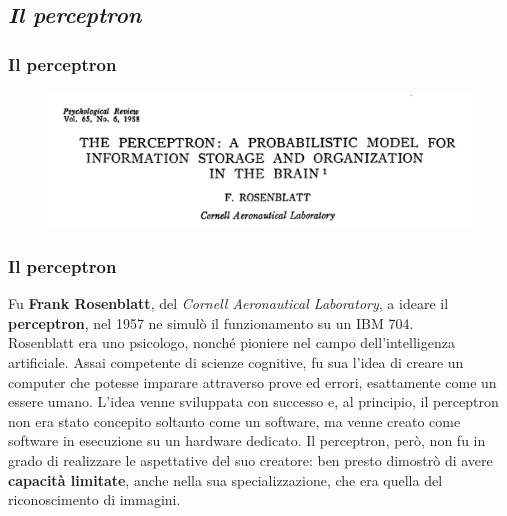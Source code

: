 \subsection[Il perceptron]{\textit{Il perceptron}}

\begin{frame}
	
	\frametitle{Il perceptron}

		\begin{figure}[!htbp]
			\centering
			\includegraphics[width=1.0\linewidth]{images/supervised/perceptron/ronsenblatt_psychological_review.jpg}
		\end{figure}

\end{frame}


\begin{frame}
	
	\frametitle{Il perceptron}
	
		Fu \textbf{Frank Rosenblatt}, del \textit{Cornell Aeronautical Laboratory}, a ideare il \textbf{perceptron}, nel 1957 ne simulò il funzionamento su un IBM 704.\\
		Rosenblatt era uno psicologo, nonché pioniere nel campo dell'intelligenza artificiale. Assai competente di scienze cognitive, fu sua l'idea di creare un computer che potesse imparare attraverso prove ed errori, esattamente come un essere umano.
		\newlinedouble
		L'idea venne sviluppata con successo e, al principio, il perceptron non era stato concepito soltanto come un software, ma venne creato come software in esecuzione su un hardware dedicato.
		\newlinedouble
		Il perceptron, però, non fu in grado di realizzare le aspettative del suo creatore: ben presto dimostrò di avere \textbf{capacità limitate}, anche nella sua specializzazione, che era quella del riconoscimento di immagini.
		 

\end{frame}


